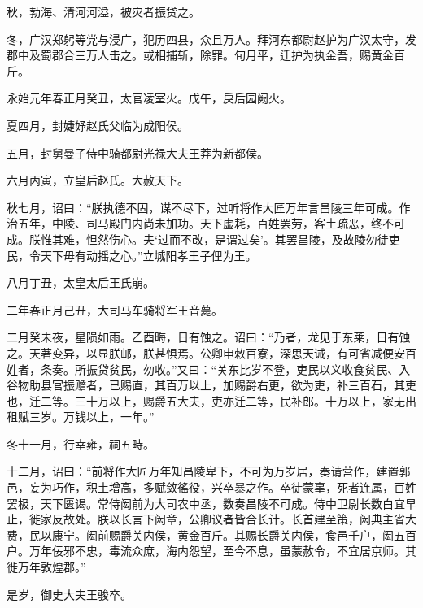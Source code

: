 \documentclass[12pt,UTF8]{ctexbook}
\begin{document}
秋，勃海、清河河溢，被灾者振贷之。



冬，广汉郑躬等党与浸广，犯历四县，众且万人。拜河东都尉赵护为广汉太守，发郡中及蜀郡合三万人击之。或相捕斩，除罪。旬月平，迁护为执金吾，赐黄金百斤。



永始元年春正月癸丑，太官凌室火。戊午，戾后园阙火。



夏四月，封婕妤赵氏父临为成阳侯。



五月，封舅曼子侍中骑都尉光禄大夫王莽为新都侯。



六月丙寅，立皇后赵氏。大赦天下。



秋七月，诏曰：“朕执德不固，谋不尽下，过听将作大匠万年言昌陵三年可成。作治五年，中陵、司马殿门内尚未加功。天下虚耗，百姓罢劳，客土疏恶，终不可成。朕惟其难，怛然伤心。夫‘过而不改，是谓过矣’。其罢昌陵，及故陵勿徒吏民，令天下毋有动摇之心。”立城阳孝王子俚为王。



八月丁丑，太皇太后王氏崩。



二年春正月己丑，大司马车骑将军王音薨。



二月癸未夜，星陨如雨。乙酉晦，日有蚀之。诏曰：“乃者，龙见于东莱，日有蚀之。天著变异，以显朕邮，朕甚惧焉。公卿申敕百寮，深思天诫，有可省减便安百姓者，条奏。所振贷贫民，勿收。”又曰：“关东比岁不登，吏民以义收食贫民、入谷物助县官振赡者，已赐直，其百万以上，加赐爵右更，欲为吏，补三百石，其吏也，迁二等。三十万以上，赐爵五大夫，吏亦迁二等，民补郎。十万以上，家无出租赋三岁。万钱以上，一年。”



冬十一月，行幸雍，祠五畤。



十二月，诏曰：“前将作大匠万年知昌陵卑下，不可为万岁居，奏请营作，建置郭邑，妄为巧作，积土增高，多赋敛徭役，兴卒暴之作。卒徒蒙辜，死者连属，百姓罢极，天下匮谒。常侍闳前为大司农中丞，数奏昌陵不可成。侍中卫尉长数白宜早止，徙家反故处。朕以长言下闳章，公卿议者皆合长计。长首建至策，闳典主省大费，民以康宁。闳前赐爵关内侯，黄金百斤。其赐长爵关内侯，食邑千户，闳五百户。万年佞邪不忠，毒流众庶，海内怨望，至今不息，虽蒙赦令，不宜居京师。其徙万年敦煌郡。”



是岁，御史大夫王骏卒。
\end{document}
